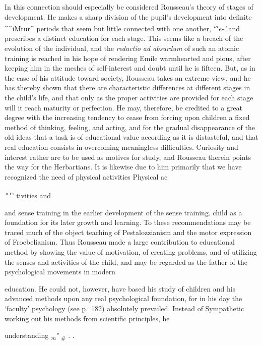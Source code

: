 \documentclass[
]{book}
\begin{document}
In this connection should especially be considered Rousseau's theory of stages of development. He makes\protect\hypertarget{ch19.xmlux5cux23para.278.1.0.box.138.233.1266.1232.q.60}{}{ a sharp division of the pupil's development into definite \^{}\^{}iMtur\^{} periods that seem but little connected with one another, \emph{\textsuperscript{ia}e-'} and prescribes a distinct education for each stage. This seems like a breach of the evolution of the individual, and the \emph{reductio ad absurdum} of such an atomic training is reached in his hope of rendering Emile warmhearted and pious, after keeping him in the meshes of self-interest and doubt until he is fifteen. But, as in the case of his attitude toward society, Rousseau takes an extreme view, and he has thereby shown that there are characteristic differences at different stages in the child's life, and that only as the proper activities are provided for each stage will it reach maturity or perfection. He may, therefore, be credited to a great degree with the increasing tendency to cease from forcing upon children a fixed method of thinking, feeling, and acting, and for the gradual disappearance of the old ideas that a task is of educational value according as it is distasteful, and that real education consists in overcoming meaningless difficulties. Curiosity and interest rather are to be used as motives for study, and Rousseau therein points the way for the Herbartians. It is likewise due to him primarily that we have recognized the need of physical activities Physical ac}

\emph{°} \textsuperscript{r}' tivities and

and sense training in the earlier development of the sense training. child as a foundation for its later growth and learning. To these recommendations may be traced much of the object teaching of Pestalozzianism and the motor expression of Froebelianism. Thus Rousseau made a large contribution to educational method by showing the value of motivation, of creating problems, and of utilizing the senses and activities of the child, and may be regarded as the father of the psychological movements in modern

education. He could not, however, have based his study of children and his advanced methods upon any real psychological foundation, for in his day the `faculty' psychology (see p.~182) absolutely prevailed. Instead of Sympathetic working out his methods from scientific principles, he

understanding \emph{\textsubscript{m}"} \textsubscript{\#} . .
\end{document}
